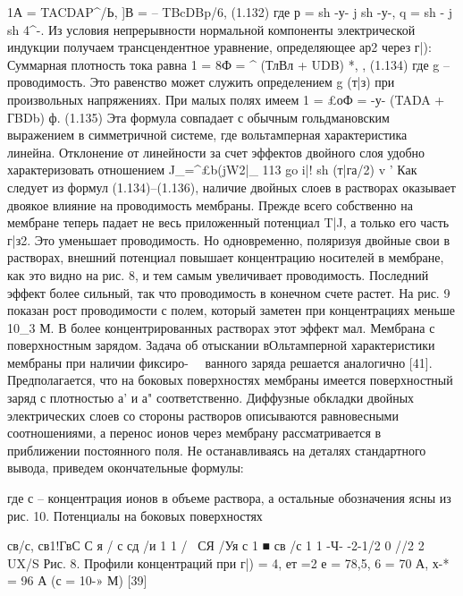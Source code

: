 {1А = TACDAP^/Ь, ]В = -- TBcDBp/6, (1.132)
где
р = sh -у- j sh -у-, q = sh - j sh 4^-.
Из условия непрерывности нормальной компоненты электрической индукции получаем трансцендентное уравнение, определяющее ар2 через г|):
Суммарная плотность тока равна
1 = 8Ф = ^ (ТлВл + UDB) *, , (1.134)
где g -- проводимость. Это равенство может служить определением g (т|з) при произвольных напряжениях. При малых полях имеем
1 = £оФ = -у- (TADA + ГBDb) ф. (1.135)
Эта формула совпадает с обычным гольдмановским выражением в симметричной системе, где вольтамперная характеристика линейна. Отклонение от линейности за счет эффектов двойного слоя удобно характеризовать отношением
J_=^£b(jW2|_ 113
go i|! sh (т|га/2) v '
Как следует из формул (1.134)--(1.136), наличие двойных слоев в растворах оказывает двоякое влияние на проводимость мембраны. Прежде всего собственно на мембране теперь падает не весь приложенный потенциал T|J, а только его часть г|з2. Это уменьшает проводимость. Но одновременно, поляризуя двойные свои в растворах, внешний потенциал повышает концентрацию носителей в мембране, как это видно на рис. 8, и тем самым увеличивает проводимость. Последний эффект более сильный, так что проводимость в конечном счете растет. На рис. 9 показан рост проводимости с полем, который заметен при концентрациях меньше 10_3 М. В более концентрированных растворах этот эффект мал.
Мембрана с поверхностным зарядом. Задача об отыскании вОльтамперной характеристики мембраны при наличии фиксиро- 
ванного заряда решается аналогично [41]. Предполагается, что на боковых поверхностях мембраны имеется поверхностный заряд с плотностью а' и а" соответственно. Диффузные обкладки двойных электрических слоев со стороны растворов описываются равновесными соотношениями, а перенос ионов через мембрану рассматривается в приближении постоянного поля. Не останавливаясь на деталях стандартного вывода, приведем окончательные формулы:


где с -- концентрация ионов в объеме раствора, а остальные обозначения ясны из рис. 10. Потенциалы на боковых поверхностях


св/с, св1!ГвС С я / с
сд /и 1 1 / \
СЯ /Уя с 1 ■ св /с 1 1
-Ч- -2-1/2 0 //2 2 UX/S
Рис. 8. Профили концентраций при г|) = 4, ет =2 е = 78,5, 6 = 70 А, х-* = 96 А (с = 10-» М) [39]




}
